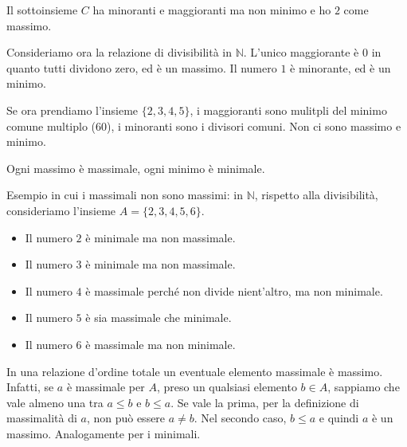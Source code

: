 \documentclass[a4paper]{article}
\begin{document}
Il sottoinsieme \(C\) ha minoranti e maggioranti ma non minimo e ho \(2\) come massimo.

Consideriamo ora la relazione di divisibilità in \(\mathbb{N}\).
L'unico maggiorante è \(0\) in quanto tutti dividono zero, ed è un massimo.
Il numero \(1\) è minorante, ed è un minimo.

Se ora prendiamo l'insieme \(\{2,3,4,5\}\), i maggioranti sono mulitpli del minimo comune multiplo (\(60\)),
i minoranti sono i divisori comuni. Non ci sono massimo e minimo.





Ogni massimo è massimale, ogni minimo è minimale.

Esempio in cui i massimali non sono massimi: in \(\mathbb{N}\), rispetto alla divisibilità,
consideriamo l'insieme \(A= \{2,3,4,5,6\}\).

\begin{itemize}
    \item Il numero \(2\) è minimale ma non massimale.
    \item Il numero \(3\) è minimale ma non massimale.
    \item Il numero \(4\) è massimale perché non divide nient'altro, ma non minimale.
    \item Il numero \(5\) è sia massimale che minimale.
    \item Il numero \(6\) è massimale ma non minimale.
\end{itemize}

In una relazione d'ordine totale un eventuale elemento massimale è massimo.
Infatti, se \(a\) è massimale per \(A\), preso un qualsiasi elemento
\(b\in A\), sappiamo che vale almeno una tra \(a \leq b\) e \(b \leq a\).
Se vale la prima, per la definizione di massimalità di \(a\), non può essere \(a\neq b\).
Nel secondo caso, \(b \leq a\) e quindi \(a\) è un massimo.
Analogamente per i minimali.
\end{document}
